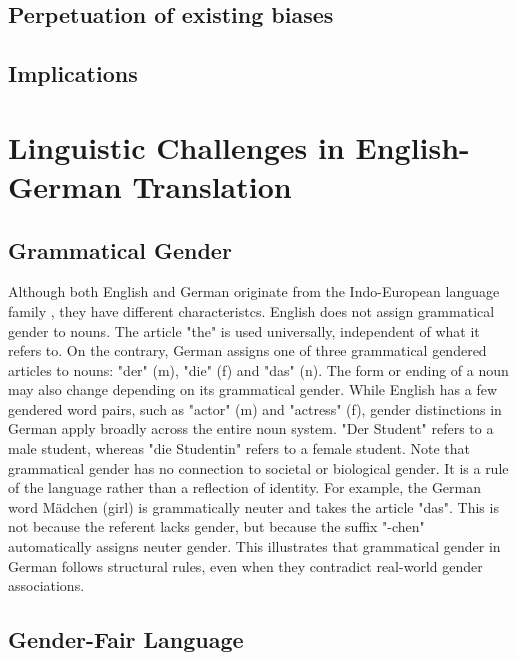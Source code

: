 

\subsection{Perpetuation of existing biases}


\subsection{Implications}

\section{Linguistic Challenges in English-German Translation}

\subsection{Grammatical Gender}
Although both English and German originate from the Indo-European language family \citep{baldiEnglishIndoEuropeanLanguage2008}, they have different characteristcs. English does not assign grammatical gender to nouns. The article "the" is used universally, independent of what it refers to. On the contrary, German assigns one of three grammatical gendered articles to nouns: "der" (m), "die" (f) and "das" (n). The form or ending of a noun may also change depending on its grammatical gender. While English has a few gendered word pairs, such as "actor" (m) and "actress" (f), gender distinctions in German apply broadly across the entire noun system. "Der Student" refers to a male student, whereas "die Studentin" refers to a female student. Note that grammatical gender has no connection to societal or biological gender. It is a rule of the language rather than a reflection of identity. For example, the German word Mädchen (girl) is grammatically neuter and takes the article "das". This is not because the referent lacks gender, but because the suffix "-chen" automatically assigns neuter gender. This illustrates that grammatical gender in German follows structural rules, even when they contradict real-world gender associations.

\subsection{Gender-Fair Language}

